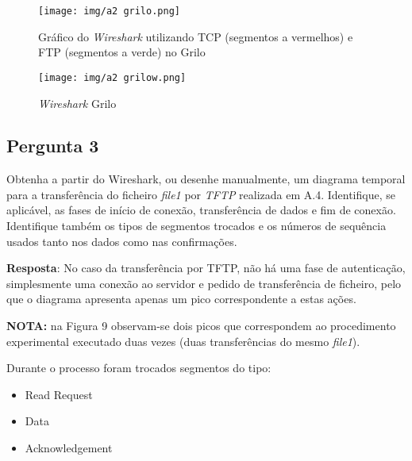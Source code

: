 \documentclass[runningheads]{llncs}
\begin{document}
    \begin{figure}[!ht]
    \centering
    \texttt{[image: img/a2 grilo.png]}
    \caption{Gráfico do \textit{Wireshark} utilizando TCP (segmentos a vermelhos) e FTP (segmentos a verde) no Grilo} 
    \label{fig:data22}
    \end{figure}
    
    \begin{figure}[ht]
    \centering
    \texttt{[image: img/a2 grilow.png]}
    \caption{\textit{Wireshark} Grilo} 
    \label{fig:data23}
    \end{figure}
    
    \pagebreak
    \paragraph{}
    \paragraph{}
    \paragraph{}
    \paragraph{}
    \subsection{Pergunta 3} 
    Obtenha a partir do Wireshark, ou desenhe manualmente, um diagrama temporal para a transferência do ficheiro \textit{file1} por \textit{TFTP} realizada em A.4. Identifique, se aplicável, as fases de início de conexão, transferência de dados e fim de conexão. Identifique também os tipos de segmentos trocados e os números de sequência usados tanto nos dados como nas confirmações.
    
    
    \textbf{Resposta}: No caso da transferência por TFTP, não há uma fase de autenticação, simplesmente uma conexão ao servidor e pedido de transferência de ficheiro, pelo que o diagrama apresenta apenas um pico correspondente a estas ações.
    
    \textbf{NOTA:} na Figura 9 observam-se dois picos que correspondem ao procedimento experimental executado duas vezes (duas transferências do mesmo \textit{file1}).
    
    Durante o processo foram trocados segmentos do tipo: 
    \begin{itemize}
        \item Read Request
        \item Data
        \item Acknowledgement
    \end{itemize}
    
\end{document}
